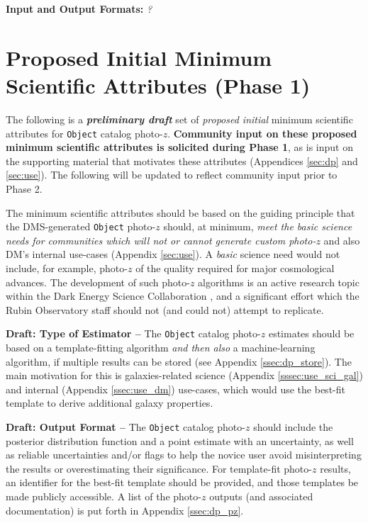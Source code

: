 \documentclass[DM,lsstdraft,toc]{lsstdoc}
\begin{document}
\textbf{Input and Output Formats: } \textit{?}




\clearpage
\section{Proposed Initial Minimum Scientific Attributes (Phase 1)}\label{sec:mvp}

The following is a \textbf{\textit{preliminary draft}} set of {\it proposed initial} minimum scientific attributes for {\tt Object} catalog photo-$z$.
\textbf{Community input on these proposed minimum scientific attributes is solicited during Phase 1}, as is input on the supporting material that motivates these attributes (Appendices \ref{sec:dp} and \ref{sec:use}).
The following will be updated to reflect community input prior to Phase 2.

The minimum scientific attributes should be based on the guiding principle that the DMS-generated {\tt Object} photo-$z$ should, at minimum, {\it meet the basic science needs for communities which will not or cannot generate custom photo-$z$} and also DM's internal use-cases (Appendix \ref{sec:use}).
A {\it basic} science need would not include, for example, photo-$z$ of the quality required for major cosmological advances.
The development of such photo-$z$ algorithms is an active research topic within the Dark Energy Science Collaboration \citep{2018arXiv180901669T}, and a significant effort which the Rubin Observatory staff should not (and could not) attempt to replicate. 

{\bf Draft: Type of Estimator --} 
The {\tt Object} catalog photo-$z$ estimates should be based on a template-fitting algorithm {\it and then also} a machine-learning algorithm, if multiple results can be stored (see Appendix \ref{ssec:dp_store}).
The main motivation for this is galaxies-related science (Appendix \ref{sssec:use_sci_gal}) and internal (Appendix \ref{ssec:use_dm}) use-cases, which would use the best-fit template to derive additional galaxy properties.

{\bf Draft: Output Format --} 
The {\tt Object} catalog photo-$z$ should include the posterior distribution function and a point estimate with an uncertainty, as well as reliable uncertainties and/or flags to help the novice user avoid misinterpreting the results or overestimating their significance.
For template-fit photo-$z$ results, an identifier for the best-fit template should be provided, and those templates be made publicly accessible.
A list of the photo-$z$ outputs (and associated documentation) is put forth in Appendix \ref{ssec:dp_pz}.
\end{document}
